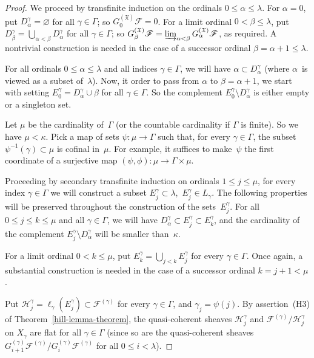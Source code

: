 \documentclass[12pt,a4paper]{amsart}
\newcommand{\+}{\protect\nobreakdash-}
\renewcommand{\:}{\colon}
\newcommand{\rarrow}{\longrightarrow}
\newcommand{\cH}{\mathcal H}
\newcommand{\fX}{\mathfrak X}
\newcommand{\rF}{\mathscr F}
\theoremstyle{plain}
\theoremstyle{definition}
\begin{document}
\begin{proof}
 We proceed by transfinite induction on the ordinals
$0\le\alpha\le\lambda$.
 For $\alpha=0$, put $D_\alpha^\gamma=\varnothing$ for all
$\gamma\in\Gamma$; so $G^{(\fX)}_0\rF=0$.
 For a limit ordinal $0<\beta\le\lambda$, put
$D_\beta^\gamma=\bigcup_{\alpha<\beta}D_\alpha^\gamma$ for all
$\gamma\in\Gamma$; so $G^{(\fX)}_\beta\rF=
\varinjlim_{\alpha<\beta}G^{(\fX)}_\alpha\rF$, as required.
 A nontrivial construction is needed in the case of a successor
ordinal $\beta=\alpha+1\le\lambda$.

 For all ordinals $0\le\alpha\le\lambda$ and all indices
$\gamma\in\Gamma$, we will have $\alpha\subset D_\alpha^\gamma$
(where $\alpha$~is viewed as a subset of~$\lambda$).
 Now, it order to pass from $\alpha$ to $\beta=\alpha+1$, we
start with setting $E_0^\gamma=D_\alpha^\gamma\cup\beta$ for
all $\gamma\in\Gamma$.
 So the complement $E_0^\gamma\setminus D_\alpha^\gamma$ is
either empty or a singleton set.

 Let $\mu$ be the cardinality of~$\Gamma$ (or the countable
cardinality if $\Gamma$ is finite).
 So we have $\mu<\kappa$.
 Pick a map of sets $\psi\:\mu\rarrow\Gamma$ such that, for every
$\gamma\in\Gamma$, the subset $\psi^{-1}(\gamma)\subset\mu$
is cofinal in~$\mu$.
 For example, it suffices to make~$\psi$ the first coordinate of
a surjective map $(\psi,\phi)\:\mu\rarrow\Gamma\times\mu$.

 Proceeding by secondary transfinite induction on ordinals
$1\le j\le\mu$, for every index $\gamma\in\Gamma$ we will construct
a subset $E_j^\gamma\subset\lambda$, \,$E_j^\gamma\in L_\gamma$.
 The following properties will be preserved throughout the construction
of the sets~$E_j^\gamma$.
 For all $0\le j\le k\le\mu$ and all $\gamma\in\Gamma$, we will have
$D_\alpha^\gamma\subset E_j^\gamma\subset E_k^\gamma$, and
the cardinality of the complement $E_j^\gamma\setminus D_\alpha^\gamma$
will be smaller than~$\kappa$.

 For a limit ordinal $0<k\le\mu$, put
$E_k^\gamma=\bigcup_{j<k}E_j^\gamma$ for every $\gamma\in\Gamma$.
 Once again, a substantial construction is needed in the case of
a successor ordinal $k=j+1<\mu$.

 Put $\cH_j^\gamma=\ell_\gamma(E_j^\gamma)\subset\rF^{(\gamma)}$ for
every $\gamma\in\Gamma$, and $\gamma_j=\psi(j)$.
 By assertion~(H3) of Theorem~\ref{hill-lemma-theorem},
the quasi-coherent sheaves $\cH_j^\gamma$ and
$\rF^{(\gamma)}/\cH_j^\gamma$ on $X_\gamma$ are flat for all
$\gamma\in\Gamma$ (since so are the quasi-coherent sheaves
$G^{(\gamma)}_{i+1}\rF^{(\gamma)}/G^{(\gamma)}_i\rF^{(\gamma)}$
for all $0\le i<\lambda$).


\end{proof}
\end{document}
